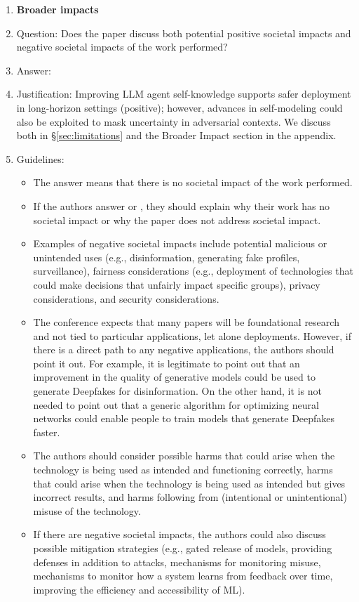 \documentclass[11pt]{article}
\begin{document}
\begin{enumerate}
\item {\bf Broader impacts}
    \item[] Question: Does the paper discuss both potential positive societal impacts and negative societal impacts of the work performed?
    \item[] Answer: \answerYes{}
    \item[] Justification: Improving LLM agent self-knowledge supports safer deployment in long-horizon settings (positive); however, advances in self-modeling could also be exploited to mask uncertainty in adversarial contexts. We discuss both in \S\ref{sec:limitations} and the Broader Impact section in the appendix.
    \item[] Guidelines:
    \begin{itemize}
        \item The answer \answerNA{} means that there is no societal impact of the work performed.
        \item If the authors answer \answerNA{} or \answerNo, they should explain why their work has no societal impact or why the paper does not address societal impact.
        \item Examples of negative societal impacts include potential malicious or unintended uses (e.g., disinformation, generating fake profiles, surveillance), fairness considerations (e.g., deployment of technologies that could make decisions that unfairly impact specific groups), privacy considerations, and security considerations.
        \item The conference expects that many papers will be foundational research and not tied to particular applications, let alone deployments. However, if there is a direct path to any negative applications, the authors should point it out. For example, it is legitimate to point out that an improvement in the quality of generative models could be used to generate Deepfakes for disinformation. On the other hand, it is not needed to point out that a generic algorithm for optimizing neural networks could enable people to train models that generate Deepfakes faster.
        \item The authors should consider possible harms that could arise when the technology is being used as intended and functioning correctly, harms that could arise when the technology is being used as intended but gives incorrect results, and harms following from (intentional or unintentional) misuse of the technology.
        \item If there are negative societal impacts, the authors could also discuss possible mitigation strategies (e.g., gated release of models, providing defenses in addition to attacks, mechanisms for monitoring misuse, mechanisms to monitor how a system learns from feedback over time, improving the efficiency and accessibility of ML).
    \end{itemize}


\end{enumerate}
\end{document}
